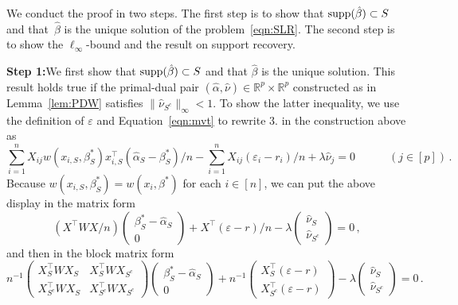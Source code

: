 \documentclass{elsarticle}
\def\T{\top}
\newcommand\norm[1]{\lVert#1\rVert}
\newcommand{\truepara}{{\beta^*}}
\newcommand{\trueparas}{{\beta^*_{S}}}
\newcommand{\estipara}{{\hat{\beta}}}
\newcommand{\tuning}{{\lambda}}
\newcommand{\R}{{\mathbb{R}}}
\newcommand{\primal}{{\hat{\alpha}}}
\newcommand{\prims}{{\hat{\alpha}_{S}}}
\newcommand{\dual}{{\hat{\nu}}}
\newcommand{\duals}{{\hat{\nu}_{S}}}
\newcommand{\dualsc}{{\hat{\nu}_{{S}^c}}}
\newcommand{\dualj}{{\hat{\nu}_j}}
\newcommand{\deriva}{{W}}
\newcommand{\derivafun}{w}
\newcommand{\res}{r}
\begin{document}
We conduct the proof in two steps. The first step is to show that $\textnormal{supp}(\estipara)\subset S$ and that~$\estipara$ is the unique solution of the problem~\eqref{eqn:SLR}. The second step is to show the $\ell_{\infty}$-bound and the result on support recovery.


\textbf{Step 1:}\enspace We first show that $\textnormal{supp}(\estipara)\subset S$ and that $\estipara$ is the unique solution. This result holds true if the primal-dual pair $(\primal,\dual)\in \R^p\times \R^p$ constructed as in Lemma~\ref{lem:PDW} satisfies
  $ \norm{\dualsc}_{\infty}<1$. To show the latter inequality, we use the definition of $\varepsilon$ and Equation~\eqref{eqn:mvt} to rewrite $3.$ in the construction above as
  \[ \sum_{i=1}^n X_{ij} \derivafun(x_{i,S},\trueparas) x_{i,S}^\T (\prims-\trueparas)/n-\sum_{i=1}^n X_{ij}(\varepsilon_i-r_i)/n+\tuning \dualj=0 \qquad\quad (j\in[p])\,.\]
 Because $\derivafun(x_{i,S},\trueparas)=\derivafun(x_{i},\truepara)$ for each $i\in [n]$, we can  put the above display in the matrix form
  \begin{equation*}
   (X^\T \deriva X/n)
   \left(\begin{matrix}
     \trueparas-\prims\\
     0
     \end{matrix}\right)+
     X^\T (\varepsilon-\res)/n -\tuning \left(
     \begin{matrix}
       \duals\\
       \dualsc
     \end{matrix}\right)=0\,,
   \end{equation*}
   and then in the block matrix form
   \begin{equation*}\label{eqn:BM}
     n^{-1}\left(
     \begin{matrix}
       X_{S}^\T \deriva X_{S} & X_{S}^\T \deriva X_{{S}^c}\\
       X_{{S}^c}^\T \deriva X_{S} &X_{{S}^c}^\top \deriva X_{{S}^c}
     \end{matrix}\right)
     \left(\begin{matrix}
     \trueparas-\prims\\
     0
     \end{matrix}\right)+n^{-1}
     \left(\begin{matrix}
       X_{S}^\top(\varepsilon-\res)\\
       X_{{S}^c}^\top(\varepsilon-\res)
     \end{matrix}\right)
     -\tuning\left(
     \begin{matrix}
      \duals\\
       \dualsc
     \end{matrix}\right)=0\,.
   \end{equation*}
\end{document}
